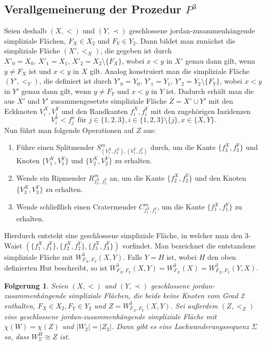 \documentclass[12pt,titlepage]{article}
\newtheorem{folgerung}{Folgerung}[section]
\begin{document}
\subsection{Verallgemeinerung der Prozedur $P^3$}
Seien deshalb $(X,<)$ und $(Y,\prec)$ geschlossene jordan-zusammenhängende simpliziale Flächen, $F_X \in X_2$ und $F_Y \in Y_2$. Dann bildet man zunächst die simpliziale Fläche $(X',<_X)$, die  gegeben ist durch $X'_0=X_0,\,X'_1=X_1,\,X'_2=X_2\setminus \{F_X\}$, wobei $x<y$ in $X'$ genau dann gilt, wenn $y\neq F_X$ ist und $x<y$ in $X$ gilt. Analog konstruiert man die simpliziale Fläche $(Y',<_Y)$, die definiert ist durch $Y'_0=Y_0,\,Y'_1=Y_1,\,Y'_2=Y_2\setminus \{F_Y\}$, wobei $x<y$ in $Y'$ genau dann gilt, wenn $y\neq F_Y$ und $x<y$ in $Y$ ist.
Dadurch erhält man die aus $X'$ und $Y'$ zusammengesetzte simpliziale Fläche $Z=X' \cup Y'$ mit den Eckknoten $V_i^{X},V_i^{Y}$ und den Randkanten $f_i^{X},f_i^{Y}$ mit den zugehörigen Inzidenzen 
\[
V^x_i < f^x_j \text{ für } j\in \{1,2,3\},i\in\{1,2,3\}\setminus \{j\}, x\in \{X,Y\}.
\]
Nun führt man folgende Operationen auf $Z$ aus:
\begin{enumerate}
\item Führe einen Splitmender $S^m_{(V_1^X,f_3^X),(V_1^Y,f_3^Y)}$ durch, um die Kante $\{f_3^X,f_3^Y\}$ und Knoten $\{V_1^X,V_1^Y\}$ und $\{V_2^X,V_2^Y\}$ zu erhalten.
\item Wende ein Ripmender $R^m_{f_2^X, f_2^Y}$ an, um die Kante $\{f_2^X ,f_2^Y\}$ und den Knoten $\{V_3^X,V_3^Y\}$ zu erhalten. 
\item Wende schließlich einen Cratermender $C^m_{f_1^X,f_1^Y}$, um die Kante $\{f_1^X,f_1^Y\}$ zu erhalten.
\end{enumerate}
Hierdurch entsteht eine geschlossene simpliziale Fläche, in welcher man den 3-Waist $(\{f_1^X,f_1^Y\},\{f_2^X,f_2^Y\},\{f_3^X,f_3^Y\})$ vorfindet. Man bezeichnet die entstandene simpliziale Fläche mit $W^3_{F_X,F_Y}(X,Y)$. Falls $Y=H$ ist, wobei $H$ den oben definierten Hut beschreibt, so ist $W^3_{F_X,F_Y}(X,Y)=W^3_{F_X}(X)=W^3_{F_X,F_Y}(Y,X)$.
\begin{folgerung} 
Seien $(X,<)$ und $(Y, \prec)$ geschlossene jordan-zusammenhängende simpliziale Flächen, die beide keine Knoten vom Grad 2 enthalten, $F_X\in X_2 ,F_Y \in Y_2$ und $Z=W_{F_X,F_Y}^3(X,Y)$. Sei außerdem $(Z,<_Z)$ eine geschlossene jordan-zusammenhängende simpliziale Fläche mit $\chi(W)=\chi(Z)$ und $\vert W_2 \vert=\vert Z_2\vert $. Dann gibt es eine Lochwanderungssequenz $\Sigma$ so, dass $W_{\Sigma}^H \cong Z$ ist. 
\end{folgerung} 
\end{document}
